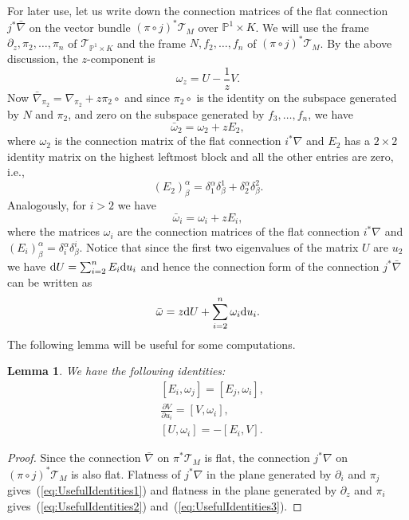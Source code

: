 \documentclass[pdftex]{sigma}
\numberwithin{equation}{section}
\newtheorem{Lemma}[Theorem]{Lemma}
\begin{document}
 For later use, let us write down the connection matrices of the flat connection $j^{*}\bar{\nabla}$ on the vector bundle $(\pi\circ j)^{*}\mathcal{T}_{M}$ over $\mathbb{P}^{1}\times K$. We will use the frame $\partial_{z},\pi_{2},\dots,\pi_{n}$ of $\mathcal{T}_{\mathbb{P}^{1}\times K}$ and the frame $N,f_{2},\dots,f_{n}$ of $(\pi\circ j)^{*}\mathcal{T}_{M}$. By the above discussion, the $z$-component is
 \begin{equation*}
 \omega_{z}=U-\frac{1}{z}V.
 \end{equation*}
 Now $\bar{\nabla}_{\pi_{2}}=\nabla_{\pi_{2}}+z\pi_{2}\circ$ and since $\pi_{2}\circ$ is the identity on the subspace generated by $N$ and $\pi_{2}$, and zero on the subspace generated by $f_{3},\dots,f_{n}$, we have
 \begin{equation*}
 \bar{\omega}_{2}=\omega_{2}+zE_{2},
 \end{equation*}
 where $\omega_{2}$ is the connection matrix of the flat connection $i^{*}\nabla$ and $E_{2}$ has a $2\times 2$ identity matrix on the highest leftmost block and all the other entries are zero, i.e.,
 \begin{equation*}
 (E_{2})^{\alpha}_{\beta}=\delta^{\alpha}_{1}\delta^{1}_{\beta}+\delta^{\alpha}_{2}\delta^{2}_{\beta}.
 \end{equation*}
 Analogously, for $i>2$ we have
 \begin{equation*}
 \bar{\omega}_{i}=\omega_{i}+zE_{i},
 \end{equation*}
 where the matrices $\omega_{i}$ are the connection matrices of the flat connection $i^{*}\nabla$ and $(E_{i})^{\alpha}_{\beta}=\delta^{\alpha}_{i}\delta^{i}_{\beta}$. Notice that since the first two eigenvalues of the matrix $U$ are $u_{2}$ we have ${\rm d}U=\sum_{i=2}^{n}E_{i}{\rm d}u_{i}$ and hence the connection form of the connection $j^{*}\bar{\nabla}$ can be written as
 \begin{equation}
 \label{eq:ConnectionForm}
 \bar{\omega}=z{\rm d}U+\sum_{i=2}^{n}\omega_{i}{\rm d}u_{i}.
 \end{equation}
 The following lemma will be useful for some computations.
 \begin{Lemma}
 We have the following identities:
 \begin{align}
 & [E_{i},\omega_{j}]=[E_{j},\omega_{i}],\label{eq:UsefulIdentities1} \\
 & \frac{\partial V}{\partial u_{i}}=[V,\omega_{i}], \label{eq:UsefulIdentities2} \\
 & \left[U,\omega_{i}\right]=-[E_{i},V]. \label{eq:UsefulIdentities3}
 \end{align}
 \end{Lemma}
 \begin{proof}
 Since the connection $\bar{\nabla}$ on $\pi^{*}\mathcal{T}_{M}$ is flat, the connection $j^{*}\nabla$ on $(\pi\circ j)^{*}\mathcal{T}_{M}$ is also flat. Flatness of $j^{*}\nabla$ in the plane generated by $\partial_{i}$ and $\pi_{j}$ gives~(\ref{eq:UsefulIdentities1}) and flatness in the plane generated by $\partial_{z}$ and $\pi_{i}$ gives~(\ref{eq:UsefulIdentities2}) and~(\ref{eq:UsefulIdentities3}).
 \end{proof}
\end{document}
